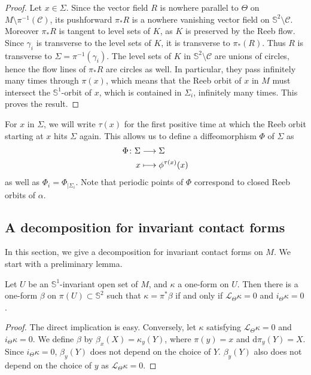 \documentclass[AHL,Unicode,longabstracts]{cedram}
\newcommand{\bbS}{\mathbb{S}}
\newcommand{\clL}{\mathcal{L}}
\newcommand{\clC}{\mathcal{C}}
\newcommand{\rmd}{\mathrm{d}}
\renewcommand*{\to}{\mathchoice{\longrightarrow}{\rightarrow}{\rightarrow}{\rightarrow}}
\let\oldmapsto\mapsto
\renewcommand*{\mapsto}{\mathchoice{\longmapsto}{\oldmapsto}{\oldmapsto}{\oldmapsto}}
\newcommand{\bbS}{\mathbb{S}}
\begin{document}
\begin{proof}
Let $x \in \Sigma$. Since the vector field $R$ is nowhere parallel to $\Theta$ on $M \setminus \pi^{-1}(\clC)$, its pushforward $\pi_{*}R$ is a nowhere vanishing vector field on $\bbS^2 \setminus \clC$. Moreover $\pi_{*}R$ is tangent to level sets of $K$, as $K$ is preserved by the Reeb flow. Since $\gamma_i$ is transverse to the level sets of $K$, it is transverse to $\pi_*(R)$. Thus $R$ is transverse to $\Sigma = \pi^{-1}(\gamma_i)$. The level sets of $K$ in $\bbS^2 \setminus \clC$ are unions of circles, hence the flow lines of $\pi_* R$ are circles as well. In particular, they pass infinitely many times through $\pi(x)$, which means that the Reeb orbit of $x$ in $M$ must intersect the $\bbS^1$-orbit of $x$, which is contained in $\Sigma_i$, infinitely many times. This proves the result.
\end{proof}

For $x$ in $\Sigma$, we will write $\tau(x)$ for the first positive time at which the Reeb orbit starting at $x$ hits $\Sigma$ again. This allows us to define a diffeomorphism $\Phi$ of $\Sigma$ as
\begin{align*}
\Phi  \colon  \Sigma &\to  \Sigma \\
 x &\mapsto \phi^{\tau(x)}(x)
\end{align*}
as well as $\Phi_i = \Phi_{|\Sigma_i}$. Note that periodic points of $\Phi$ correspond to closed Reeb orbits of $\alpha$.

\subsection{A decomposition for invariant contact forms}\label{sub:a_normal_form_for_invariant_contact_forms}

In this section, we give a decomposition for invariant contact forms on $M$. We start with a preliminary lemma.

\begin{lemm}\label{lemma:lift_form_quotient}
Let $U$ be an $\bbS^1$-invariant open set of $M$, and $\kappa$ a one-form on $U$. Then there is a one-form $\beta$ on $\pi(U) \subset \bbS^2$ such that $\kappa = \pi^* \beta$ if and only if $\clL_{\Theta} \kappa = 0$ and $i_{\Theta} \kappa = 0$.
\end{lemm}

\begin{proof}
The direct implication is easy. Conversely, let $\kappa$ satisfying $\clL_{\Theta} \kappa = 0$ and $i_{\Theta}\kappa = 0$. We define $\beta$ by $\beta_x(X) = \kappa_y(Y)$, where $\pi(y)=x$ and $\rmd  \pi_y(Y) = X$. Since $i_{\Theta} \kappa = 0$, $\beta_y(Y)$ does not depend on the choice of $Y$. $\beta_y(Y)$ also does not depend on the choice of $y$ as $\clL_{\Theta}\kappa = 0$.
\end{proof}
\end{document}
